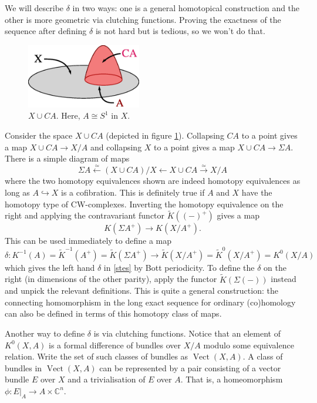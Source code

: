 \documentclass[a4paper,10pt]{article}
\theoremstyle{plain}%
\theoremstyle{definition}
\theoremstyle{remark}
\newcommand{\CC}{\mathbb{C}}
\DeclareMathOperator{\Vect}{Vect}
\newcommand{\into}{\hookrightarrow}
\newcommand{\xto}[1]{\xrightarrow{#1}}
\newcommand{\xot}[1]{\xleftarrow{#1}}
\newcommand{\ot}{\leftarrow}
\begin{document}
We will describe $\delta$ in two ways: one is a general homotopical
construction and the other is more geometric via clutching
functions. Proving the exactness of the sequence after defining
$\delta$ is not hard but is tedious, so we won't do that.

\begin{figure}
  \centering
  \label{xcupca}
  \includegraphics[width=5cm]{img/cone-on-A}
  \caption{$X \cup CA$. Here, $A \cong S^1$ in $X$.}
\end{figure}

Consider the space $X \cup CA$ (depicted in figure
\ref{xcupca}). Collapsing $CA$ to a point gives a map $X\cup CA \to
X/A$ and collapsing $X$ to a point gives a map $X\cup CA \to \Sigma
A$. There is a simple diagram of maps
\begin{equation*}
  \Sigma A \xot{\simeq} (X\cup CA) / X \ot X\cup CA \xto{\simeq} X/A
\end{equation*}
where the two homotopy equivalences shown are indeed homotopy
equivalences as long as $A \into X$ is a cofibration. This is
definitely true if $A$ and $X$ have the homotopy type of
CW-complexes. Inverting the homotopy equivalence on the right and
applying the contravariant functor $\tilde{K}((-)^+)$ gives a map
\begin{equation*}
  K(\Sigma A^+) \to K(X/A^+).
\end{equation*}
This can be used immediately to define a map
\begin{equation*}
  \delta: K^{-1}(A) = \tilde{K}^{-1}(A^+) = \tilde{K}(\Sigma A^+) \to
  \tilde{K}(X/A^+) = \tilde{K}^0(X/A^+) = K^0(X/A)
\end{equation*}
which gives the left hand $\delta$ in \eqref{stes} by Bott
periodicity. To define the $\delta$ on the right (in dimensions of the
other parity), apply the functor $\tilde{K}(\Sigma (-))$ instead and
unpick the relevant definitions. This is quite a general construction:
the connecting homomorphism in the long exact sequence for ordinary
(co)homology can also be defined in terms of this homotopy class of
maps.

Another way to define $\delta$ is via clutching functions. Notice that
an element of $K^0(X,A)$ is a formal difference of bundles over $X/A$
modulo some equivalence relation. Write the set of such classes of
bundles as $\Vect(X,A)$. A class of bundles in $\Vect(X,A)$ can be
represented by a pair consisting of a vector bundle $E$ over $X$ and a
trivialisation of $E$ over $A$. That is, a homeomorphism $\phi:
E|_A\to A\times \CC^n$.
\end{document}
